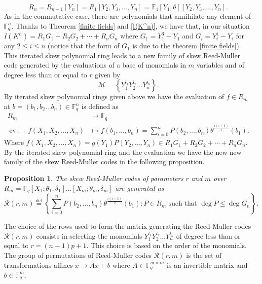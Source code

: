 \documentclass{amsproc}
\newtheorem{proposition}[theorem]{Proposition}
\numberwithin{equation}{section}
\begin{document}
$$R_n=R_{n-1}[Y_{n}]=R_1[Y_2,Y_3,\ldots,Y_n]=\mathbb{F}_4[Y_1,\theta][Y_2,Y_3,\ldots,Y_n].$$
As in the commutative case, there are polynomials that annihilate any element of $\mathbb{F}_q^n$.   Thanks to Theorem \ref{finite fields} and \ref{I(K^n)}, we have that, in our situation $I(K^n)=R_1G_1+R_2G_2+\cdots +R_nG_n$ where $G_1=Y_1^3-Y_1$ and $G_i=Y_i^4-Y_i$ for any $2\le i \le n$ (notice that the form of $G_1$ is due to the theorem \ref{finite fields}). 
This iterated skew polynomial ring leads to a new family of skew Reed-Muller code generated by the evaluations of a base of monomials in $ m $ variables and of degree less than or equal to $ r $ given by 
$$
\mathcal{M} =\left\{ Y_1^{l_1}Y_2^{l_2}\dots Y_n^{l_n}\right\}.
$$
By iterated skew polynomial rings given above we have the evaluation of $f\in R_m$  at $b=(b_1,b_2\ldots b_n) \in \mathbb{F}^n_{q}$ is defined as
$$
\begin{aligned}
R_m & \rightarrow \mathbb{F}_{q} \\
\operatorname{ev}: \quad f (X_1,X_2,\ldots,X_n) & \mapsto f(b_1,\ldots, b_n)=\sum_{i=0}^{n} P(b_2,\ldots,b_n)\theta^{\frac{i(i+1)}{2}}(b_1).
\end{aligned}
$$
Where $f (X_1,X_2,\ldots,X_n)=g(Y_1)P(Y_2,\ldots, Y_n)\in R_1G_1+R_2G_2+\cdots +R_nG_n$.
By the  iterated skew polynomial ring and  the evaluation we have the new  new family   of the skew Reed-Muller codes  in the following proposition.
\begin{proposition}
	The  skew Reed-Muller codes of parameters $ r $ and $ m $  over $R_{m}=\mathbb{F}_q[X_{1} ; \theta_{1}, \delta_{1}]\ldots [X_m ; \theta_m, \delta_m]$ are generated as
	$$
	\mathcal{R}(r, m) \stackrel{\operatorname{def}}{=}\left\{ \sum_{i=0}^{n} P(b_2,\ldots,b_n)\theta^{\frac{i(i+1)}{2}}(b_1): P \in R_m \text {  such that } \operatorname{deg} P \leqslant\operatorname{deg} G_n \right\}.
	$$	
\end{proposition}
The choice of the rows used to form the matrix generating the Reed-Muller codes 	$\mathcal{R}(r, m)$  consists in selecting the monomials $Y_1^{l_1}Y_2^{l_2}\ldots Y_n^{l_n}$ of degree less than or equal to $r=(n-1)p+1$. This choice is based on the order of the monomials.
The group of permutations of Reed-Muller codes $\mathcal{R}(r, m)$ is the set of transformations affines $x \rightarrow Ax+b$ where $A\in  \mathbb{F}_q^{m\times m}$ is an invertible matrix and $b\in\mathbb{F}_q^m$.
\end{document}
